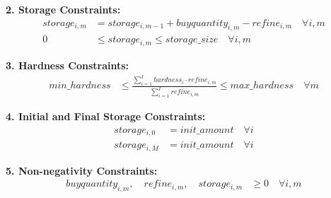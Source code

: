 \documentclass{article}
\begin{document}
\textbf{2. Storage Constraints:}
\begin{align*}
storage_{i,m} &= storage_{i,m-1} + buyquantity_{i,m} - refine_{i,m} \quad \forall i, m \\
0 & \leq storage_{i,m} \leq storage\_size \quad \forall i, m
\end{align*}

\textbf{3. Hardness Constraints:}
\begin{align*}
min\_hardness & \leq \frac{\sum_{i=1}^{I} hardness_{i} \cdot refine_{i,m}}{\sum_{i=1}^{I} refine_{i,m}} \leq max\_hardness \quad \forall m
\end{align*}

\textbf{4. Initial and Final Storage Constraints:}
\begin{align*}
storage_{i,0} &= init\_amount \quad \forall i \\
storage_{i,M} &= init\_amount \quad \forall i
\end{align*}

\textbf{5. Non-negativity Constraints:}
\begin{align*}
buyquantity_{i,m}, \quad refine_{i,m}, \quad storage_{i,m} & \geq 0 \quad \forall i, m
\end{align*}
\end{document}
